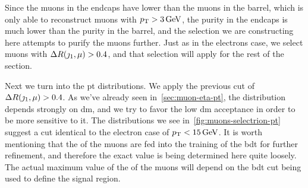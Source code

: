 Since the muons in the endcaps have lower \pt than the muons in the barrel, which is only able to reconstruct muons with $p_{\mathrm{T}}>3\,\text{Ge\hspace{-.08em}V}$, the purity in the endcaps is much lower than the purity in the barrel, and the selection we are constructing here attempts to purify the muons further. Just as in the electrons case, we select muons with $\Delta R(\jmath_1,\mu)>0.4$, and that selection will apply for the rest of the section.

Next we turn into the \gls{pt} distributions. We apply the previous cut of $\Delta R(\jmath_1,\mu)>0.4$. As we've already seen in~\ref{sec:muon-eta-pt}, the \pt distribution depends strongly on \gls{dm}, and we try to favor the low \gls{dm} acceptance in order to be more sensitive to it. The \pt distributions we see in~\ref{fig:muons-selectrion-pt} suggest a cut identical to the electron case of $p_{\mathrm{T}}<15\,\text{Ge\hspace{-.08em}V}$. It is worth mentioning that the \pt of the muons are fed into the training of the \gls{bdt} for further refinement, and therefore the exact value is being determined here quite loosely. The actual maximum value of the \pt of the muons will depend on the \gls{bdt} cut being used to define the signal region.

